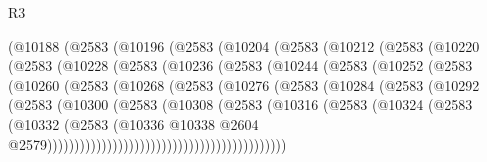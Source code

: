 \begin{lexlean}{R3}
\begin{coremodule}
              (@10188
                (@2583
                  (@10196
                    (@2583
                      (@10204
                        (@2583
                          (@10212
                            (@2583
                              (@10220
                                (@2583
                                  (@10228
                                    (@2583
                                      (@10236
                                        (@2583
                                          (@10244
                                            (@2583
                                              (@10252
                                                (@2583
                                                  (@10260
                                                    (@2583
                                                      (@10268
                                                        (@2583
                                                          (@10276
                                                            (@2583
                                                              (@10284
                                                                (@2583
                                                                  (@10292
                                                                    (@2583
                                                                      (@10300
                                                                        (@2583
                                                                          (@10308
                                                                            (@2583
                                                                              (@10316
                                                                                (@2583
                                                                                  (@10324
                                                                                    (@2583
                                                                                      (@10332
                                                                                        (@2583
                                                                                          (@10336
                                                                                            @10338
                                                                                            @2604
                                                                                            @2579))))))))))))))))))))))))))))))))))))))))))))

\end{coremodule}
\end{lexlean}
